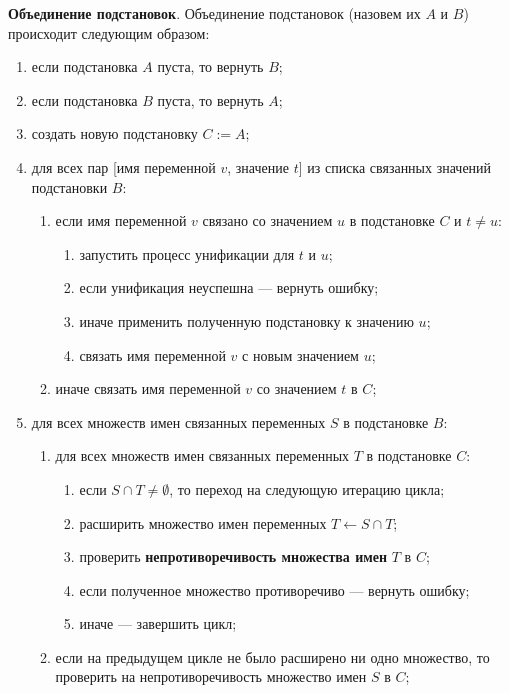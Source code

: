 \textbf{Объединение подстановок}. Объединение подстановок (назовем их $A$ и $B$) происходит следующим образом:

\begin{enumerate}
    \item если подстановка $A$ пуста, то вернуть $B$;
    \item если подстановка $B$ пуста, то вернуть $A$;
    \item создать новую подстановку $C := A$;
    \item для всех пар [имя переменной $v$, значение $t$] из списка связанных значений подстановки $B$:
    \begin{enumerate}
        \item если имя переменной $v$ связано со значением $u$ в подстановке $C$ и $t \ne u$:
        \begin{enumerate}
            \item запустить процесс унификации для $t$ и $u$;
            \item если унификация неуспешна --- вернуть ошибку;
            \item иначе применить полученную подстановку к значению $u$;
            \item связать имя переменной $v$ с новым значением $u$;
        \end{enumerate}
        \item иначе связать имя переменной $v$ со значением $t$ в $C$;
    \end{enumerate}
    \item для всех множеств имен связанных переменных $S$ в подстановке $B$:
    \begin{enumerate}
        \item для всех множеств имен связанных переменных $T$ в подстановке $C$:
        \begin{enumerate}
            \item если $S \cap T \ne \emptyset$, то переход на следующую итерацию цикла;
            \item расширить множество имен переменных $T \leftarrow S \cap T$;
            \item проверить \textbf{непротиворечивость множества имен} $T$ в $C$;
            \item если полученное множество противоречиво --- вернуть ошибку;
            \item иначе --- завершить цикл;
        \end{enumerate}
        \item если на предыдущем цикле не было расширено ни одно множество, то проверить на непротиворечивость множество имен $S$ в $C$;

\end{enumerate}
\end{enumerate}
